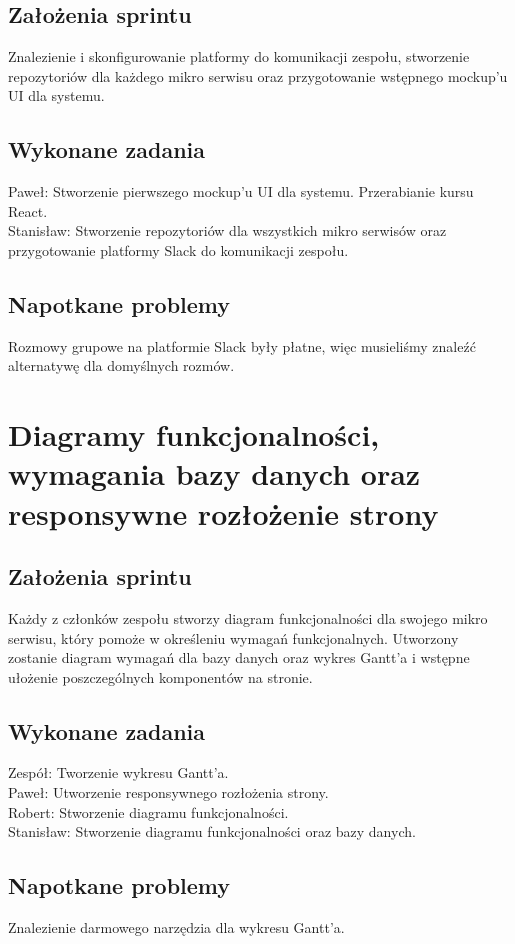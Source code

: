 \documentclass[a4paper,11pt]{report}
\begin{document}
\subsection {Założenia sprintu}
Znalezienie i skonfigurowanie platformy do komunikacji zespołu, stworzenie repozytoriów dla każdego mikro serwisu oraz przygotowanie wstępnego mockup'u UI dla systemu.
\subsection {Wykonane zadania}
Paweł: Stworzenie pierwszego mockup'u UI dla systemu. Przerabianie kursu React. \\
Stanisław: Stworzenie repozytoriów dla wszystkich mikro serwisów oraz przygotowanie platformy Slack do komunikacji zespołu.\\
\subsection {Napotkane problemy}
Rozmowy grupowe na platformie Slack były płatne, więc musieliśmy znaleźć alternatywę dla domyślnych rozmów.

\section {Diagramy funkcjonalności, wymagania bazy danych oraz responsywne rozłożenie strony}
\subsection {Założenia sprintu}
Każdy z członków zespołu stworzy diagram funkcjonalności dla swojego mikro serwisu, który pomoże w określeniu wymagań funkcjonalnych. Utworzony zostanie diagram wymagań dla bazy danych oraz wykres Gantt’a i wstępne ułożenie poszczególnych komponentów na stronie.
\subsection {Wykonane zadania}
Zespół: Tworzenie wykresu Gantt'a.\\
Paweł: Utworzenie responsywnego rozłożenia strony. \\
Robert: Stworzenie diagramu funkcjonalności. \\
Stanisław: Stworzenie diagramu funkcjonalności oraz bazy danych.\\
\subsection {Napotkane problemy}
Znalezienie darmowego narzędzia dla wykresu Gantt'a.
\end{document}
